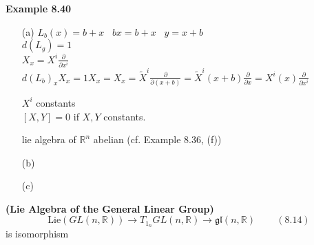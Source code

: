 \textbf{Example 8.40}
\begin{enumerate}
\item[(a)] $L_b(x) = b + x$  \quad \quad \, $bx = b + x$ \quad \quad \, $y = x + b$ \\

$d(L_g) = 1$ \\
$X_x = X^i \frac{ \partial }{ \partial x^i }$ \\
$d(L_b)_x X_x = 1 X_x = X_x = \widetilde{X}^i \frac{ \partial }{ \partial (x+b)} = \widetilde{X}^i(x+b) \frac{ \partial }{ \partial x} = X^i(x) \frac{ \partial }{ \partial x^i }$

$X^i$ constants \\

$[X,Y]=0$ if $X,Y$ constants. 

lie algebra of $\mathbb{R}^n$ abelian (cf. Example 8.36, (f))
\item[(b)]
\item[(c)]
\end{enumerate}

\begin{proposition}[8.41] \textbf{(Lie Algebra of the General Linear Group)}
  \begin{equation}
    \text{Lie}{(GL(n,\mathbb{R}))} \to T_{1_n}GL(n,\mathbb{R}) \to \mathfrak{gl}{(n,\mathbb{R})} \quad \quad \, (8.14)
\end{equation}
is isomorphism
\end{proposition}

